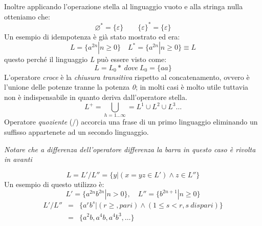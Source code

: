 Inoltre applicando l'operazione stella al linguaggio vuoto e alla stringa nulla otteniamo che:
$$\varnothing^\ast = \{\varepsilon\} \qquad \{\varepsilon\}^\ast = \{\varepsilon\}$$
Un esempio di idempotenza è già stato mostrato ed era:
$$L= \{a^{2n}| n\geq 0\} \quad L^\ast = \{a^{2n}| n\geq 0\} \equiv L$$
questo perché il linguaggio \emph{L} può essere visto come:
$$L=L_0* \ dove \ L_0 = \{aa\}$$
L'operatore \emph{croce} è la \emph{chiusura transitiva} rispetto al concatenamento, ovvero è l'unione delle potenze tranne la potenza \emph{0}; in molti casi è molto utile tuttavia non è indispensabile in quanto deriva dall'operatore stella.
$$L^+ = \bigcup_{h=1\dots\infty}=L^1\cup L^2\cup L^3 \dots$$
Operatore \emph{quoziente} ($ / $) accorcia una frase di un primo linguaggio eliminando un suffisso appartenete ad un secondo linguaggio. \begin{center}
	\textit{Notare che a differenza dell'operatore differenza la barra in questo caso è rivolta in avanti}
\end{center}
$$L=L'/L''=\{y|(x=yz \in L') \wedge z \in L''\}$$
Un esempio di questo utilizzo è:
$$L' = \{a^{2n}b^{2n}|n>0\}, \quad L'' = \{b^{2n+1} | n \geq 0 \}$$
$$
\begin{array}{rcl}
L'/L'' & = & \{a^rb^s | (r\geq , pari) \wedge (1\leq s <r, s \ dispari)\}\\
& = & \{a^2b, a^4b,a^4b^3, \dots\}
\end{array}
$$
